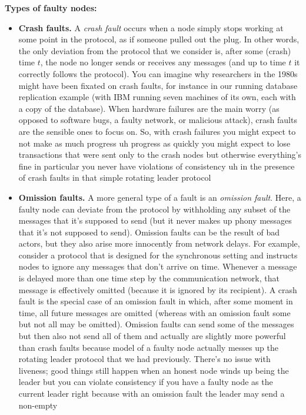 \noindent
\textbf{Types of faulty nodes:}
\begin{itemize}
    \item \textbf{Crash faults.} A \textit{crash fault} occurs when a node simply stops working at some point in
the protocol, as if someone pulled out the plug. In other words, the only deviation from the
protocol that we consider is, after some (crash) time $t$, the node no longer sends or receives
any messages (and up to time $t$ it correctly follows the protocol).
You can imagine why researchers in the 1980s might have been fixated on crash faults,
for instance in our running database replication example (with IBM running seven machines
of its own, each with a copy of the database). When hardware failures are the main worry
(as opposed to software bugs, a faulty network, or malicious attack), crash faults are the
sensible ones to focus on. So, with crash failures you might expect to not make as much
progress uh progress as quickly you might expect to lose transactions that were sent only to the crash nodes but
otherwise everything's fine in particular you never have violations of consistency uh in the presence of crash faults in that simple rotating leader protocol
    \item \textbf{Omission faults.} A more general type of a fault is an \textit{omission fault}. Here, a faulty node
can deviate from the protocol by withholding any subset of the messages that it’s supposed
to send (but it never makes up phony messages that it’s not supposed to send). Omission
faults can be the result of bad actors, but they also arise more innocently from network
delays. For example, consider a protocol that is designed for the synchronous setting and
instructs nodes to ignore any messages that don’t arrive on time. Whenever a message is
delayed more than one time step by the communication network, that message is effectively
omitted (because it is ignored by its recipient). A crash fault is the special case of an omission
fault in which, after some moment in time, all future messages are omitted (whereas with
an omission fault some but not all may be omitted). 
Omission faults can send some of the messages but then also not send all of them and actually are slightly more powerful than crash faults
because model of a faulty node actually messes up the rotating leader protocol that we had 
previously. There's no issue with liveness; good things still happen when an
honest node winds up being the leader but you can violate consistency
if you have a faulty node as the current leader right because with an omission fault the leader may send a non-empty

\end{itemize}
